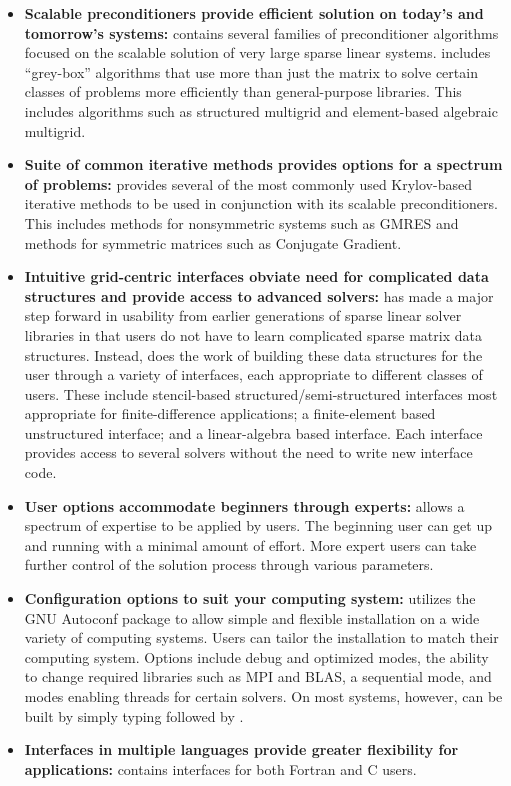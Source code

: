 \begin{itemize}

\item
{\bf Scalable preconditioners provide efficient solution on today's
and tomorrow's systems:} \hypre{} contains several families of
preconditioner algorithms focused on the scalable solution of very
large sparse linear systems. \hypre{} includes ``grey-box'' algorithms
that use more than just the matrix to solve certain classes of
problems more efficiently than general-purpose libraries. This
includes algorithms such as structured multigrid and element-based
algebraic multigrid.

\item
{\bf Suite of common iterative methods provides options for a spectrum
of problems:} \hypre{} provides several of the most commonly used
Krylov-based iterative methods to be used in conjunction with its
scalable preconditioners. This includes methods for nonsymmetric
systems such as GMRES and methods for symmetric matrices such as
Conjugate Gradient.

\item
{\bf Intuitive grid-centric interfaces obviate need for complicated
data structures and provide access to advanced solvers:} \hypre{} has
made a major step forward in usability from earlier generations of
sparse linear solver libraries in that users do not have to learn
complicated sparse matrix data structures.  Instead, \hypre{} does the
work of building these data structures for the user through a variety
of interfaces, each appropriate to different classes of users.  These
include stencil-based structured/semi-structured interfaces most
appropriate for finite-difference applications; a finite-element based
unstructured interface; and a linear-algebra based interface.  Each
interface provides access to several solvers without the need to write
new interface code.

\item
{\bf User options accommodate beginners through experts:} \hypre{}
allows a spectrum of expertise to be applied by users. The beginning
user can get up and running with a minimal amount of effort. More
expert users can take further control of the solution process through
various parameters.

\item
{\bf Configuration options to suit your computing system:} \hypre{}
utilizes the GNU Autoconf package to allow simple and flexible
installation on a wide variety of computing systems.  Users can tailor
the installation to match their computing system. Options include
debug and optimized modes, the ability to change required libraries
such as MPI and BLAS, a sequential mode, and modes enabling threads
for certain solvers.  On most systems, however, \hypre{} can be built
by simply typing  followed by .

\item
{\bf Interfaces in multiple languages provide greater flexibility for
applications:} \hypre{} contains interfaces for both Fortran and C
users.

\end{itemize}

